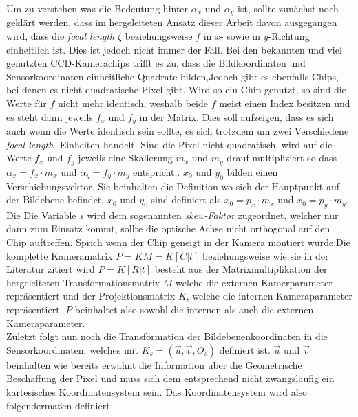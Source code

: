 		Um zu verstehen was die Bedeutung hinter $\alpha_x$ und $\alpha_y$ ist, sollte zunächst noch geklärt werden, dass im hergeleiteten Ansatz dieser Arbeit davon ausgegangen wird, dass die \textit{focal length} $\zeta$ beziehungsweise $f$ in $x$- sowie in $y$-Richtung einheitlich ist. Dies ist jedoch nicht immer der Fall. Bei den bekannten und viel genutzten CCD-Kamerachips trifft es zu, dass die Bildkoordinaten und Sensorkoordinaten einheitliche Quadrate bilden,Jedoch gibt es ebenfalls Chips, bei denen es nicht-quadratische Pixel gibt\cite{HZ}. Wird so ein Chip genutzt, so sind die Werte für $f$ nicht mehr identisch, weshalb beide $f$ meist einen Index besitzen und es steht dann jeweils $f_x$ und $f_y$ in der Matrix. Dies soll aufzeigen, dass es sich auch wenn die Werte identisch sein sollte, es sich trotzdem um zwei Verschiedene \textit{focal length}- Einheiten handelt. Sind die Pixel nicht quadratisch, wird auf die Werte $f_x$ und $f_y$ jeweils eine Skalierung $m_x$ und $m_y$ drauf multipliziert so dass  $\alpha_x = f_x \cdot m_x$ und $\alpha_y = f_y \cdot m_y$ entspricht.\cite{HZ}. $x_{0}$ und $y_{0}$ bilden einen Verschiebungsvektor. Sie beinhalten die Definition wo sich der Hauptpunkt auf der Bildebene befindet. $x_{0}$ und $y_{0}$ sind definiert als $x_{0} = p_x \cdot m_x$ und $x_{0} = p_y \cdot m_y$. Die Die Variable $s$ wird dem sogenannten \textit{skew-Faktor} zugeordnet, welcher nur dann zum Einsatz kommt, sollte die optische Achse nicht orthogonal auf den Chip auftreffen. Sprich wenn der Chip geneigt in der Kamera montiert wurde\cite{HZ}.Die komplette Kameramatrix $P=KM=K[C|t]$ beziehungsweise wie sie in der Literatur zitiert wird $P=K[R|t]$\cite{HZ} besteht aus der Matrixmultiplikation der hergeleiteten Transformationsmatrix $M$ welche die externen Kamerparameter repräsentiert und der Projektionsmatrix $K$, welche die internen Kameraparameter repräsentiert. $P$ beinhaltet also sowohl die internen als auch die externen Kameraparameter. \\
		
		Zuletzt folgt nun noch die Transformation der Bildebenenkoordinaten in die Sensorkoordinaten, welches mit $K_s = (\vec{u},\vec{v}, O_s)$ definiert ist. $\vec{u}$ und $\vec{v}$ beinhalten wie bereits erwähnt die Information über die Geometrische Beschaffung der Pixel und muss sich dem entsprechend nicht zwangsläufig ein kartesisches Koordinatensystem sein. Das Koordinatensystem wird also folgendermaßen definiert
		
